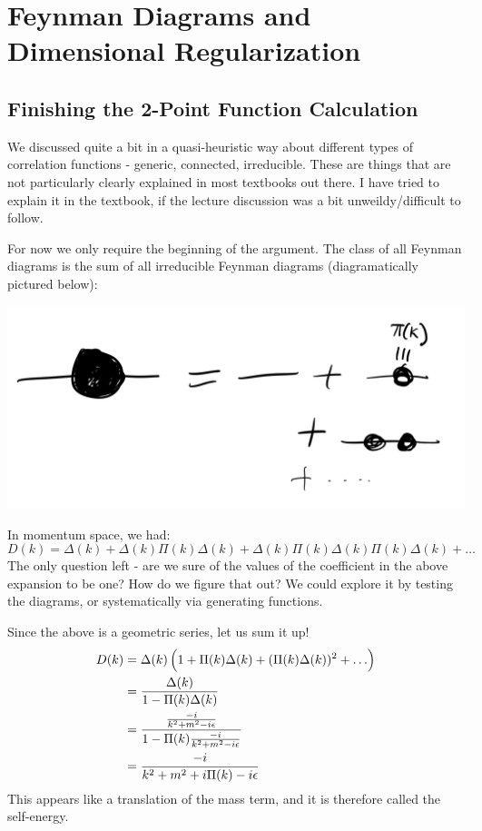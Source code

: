 \section{Feynman Diagrams and Dimensional Regularization}

\subsection{Finishing the 2-Point Function Calculation}
We discussed quite a bit in a quasi-heuristic way about different types of correlation functions - generic, connected, irreducible. These are things that are not particularly clearly explained in most textbooks out there. I have tried to explain it in the textbook, if the lecture discussion was a bit unweildy/difficult to follow.

For now we only require the beginning of the argument. The class of all Feynman diagrams is the sum of all irreducible Feynman diagrams (diagramatically pictured below):

\begin{center}
    \includegraphics[scale=0.3]{Images/fig-lec28feynman1.png}
\end{center}


In momentum space, we had:
\begin{equation}
    D(k) = \Delta(k) + \Delta(k)\Pi(k)\Delta(k) + \Delta(k)\Pi(k)\Delta(k)\Pi(k)\Delta(k) + \ldots
\end{equation}
The only question left - are we sure of the values of the coefficient in the above expansion to be one? How do we figure that out? We could explore it by testing the diagrams, or systematically via generating functions.

Since the above is a geometric series, let us sum it up!
\begin{equation}
    \begin{split}
        D(k) &= \Delta(k)\left(1 + \Pi(k)\Delta(k) + (\Pi(k)\Delta(k))^2 + \ldots\right) 
        \\ &= \frac{\Delta(k)}{1 - \Pi(k)\Delta(k)} 
        \\ &=  \frac{\frac{-i}{k^2 + m^2 - i\epsilon}}{1 - \Pi(k)\frac{-i}{k^2 + m^2 - i\epsilon}}
        \\ &= \frac{-i}{k^2 + m^2 + i\Pi(k) - i\epsilon}
    \end{split}
\end{equation}
This appears like a translation of the mass term, and it is therefore called the self-energy.

